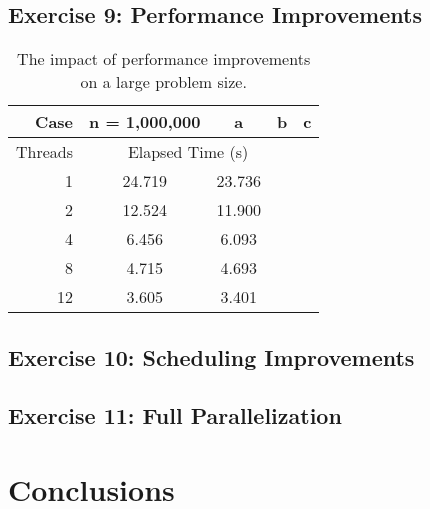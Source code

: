 \documentclass{article}
\begin{document}
\subsection{Exercise 9: Performance Improvements}

\begin{table}[h!]
	\centering
	\caption{The impact of performance improvements on a large problem size.}
	\label{tbl:speedup}
	\begin{tabular}{r|cccc}
		Case & n = 1,000,000 & a & b & c \\
		\hline
		Threads & \multicolumn{3}{c}{Elapsed Time (s)} \\
		\hline
		1 & 24.719 & 23.736 &  &  \\
		2 & 12.524 & 11.900 &  &  \\
		4 & 6.456 & 6.093 &  &  \\
		8 & 4.715 & 4.693 &  &  \\
		12 & 3.605 & 3.401 &  & 
	\end{tabular}
\end{table}

\subsection{Exercise 10: Scheduling Improvements}

\subsection{Exercise 11: Full Parallelization}

\section{Conclusions}
\end{document}

